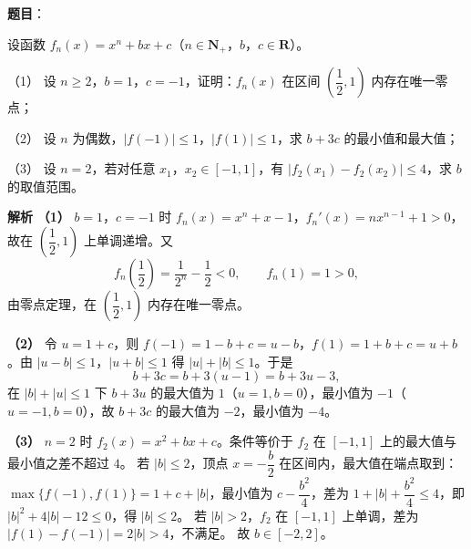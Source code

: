 \begin{answer}

\textbf{题目}：

设函数 $f_n(x)=x^n+bx+c$（$n\in\mathbf N_+$，$b$，$c\in\mathbf R$）。

（1） 设 $n\geqslant2$，$b=1$，$c=-1$，证明：$f_n(x)$ 在区间 $\left(\dfrac12,1\right)$ 内存在唯一零点；

（2） 设 $n$ 为偶数，$|f(-1)|\leqslant1$，$|f(1)|\leqslant1$，求 $b+3c$ 的最小值和最大值；

（3） 设 $n=2$，若对任意 $x_1$，$x_2\in[-1,1]$，有 $|f_2(x_1)-f_2(x_2)|\leqslant4$，求 $b$ 的取值范围。

\clearpage

\textbf{解析}
\textbf{（1）} $b=1$，$c=-1$ 时 $f_n(x)=x^n+x-1$，$f_n'(x)=nx^{n-1}+1>0$，故在 $\left(\dfrac12,1\right)$ 上单调递增。又
\nopagebreak[4]
\[f_n\left(\frac12\right)=\frac1{2^n}-\frac12<0,\qquad f_n(1)=1>0,\]
由零点定理，在 $\left(\dfrac12,1\right)$ 内存在唯一零点。

\textbf{（2）} 令 $u=1+c$，则 $f(-1)=1-b+c=u-b$，$f(1)=1+b+c=u+b$。由 $|u-b|\leqslant1$，$|u+b|\leqslant1$ 得 $|u|+|b|\leqslant1$。于是
\nopagebreak[4]
\[b+3c=b+3(u-1)=b+3u-3,\]
在 $|b|+|u|\leqslant1$ 下 $b+3u$ 的最大值为 $1$（$u=1,b=0$），最小值为 $-1$（$u=-1,b=0$），故 $b+3c$ 的最大值为 $-2$，最小值为 $-4$。

\textbf{（3）} $n=2$ 时 $f_2(x)=x^2+bx+c$。条件等价于 $f_2$ 在 $[-1,1]$ 上的最大值与最小值之差不超过 $4$。
若 $|b|\leqslant2$，顶点 $x=-\dfrac b2$ 在区间内，最大值在端点取到：$\max\{f(-1),f(1)\}=1+c+|b|$，最小值为 $c-\dfrac{b^2}4$，差为 $1+|b|+\dfrac{b^2}4\leqslant4$，即 $|b|^2+4|b|-12\leqslant0$，得 $|b|\leqslant2$。
若 $|b|>2$，$f_2$ 在 $[-1,1]$ 上单调，差为 $|f(1)-f(-1)|=2|b|>4$，不满足。
故 $b\in[-2,2]$。




\end{answer}